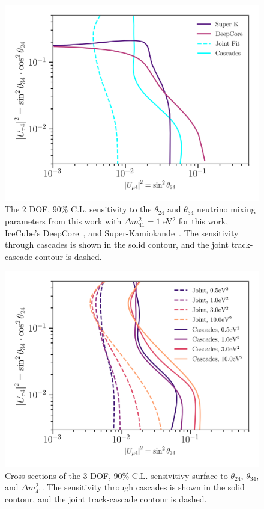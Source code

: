 \documentclass[main.tex]{subfiles}
\begin{document}
\begin{figure}
    \centering
    \includegraphics[width=0.85\linewidth]{figures/superPlot_1.00.png}
    \caption{The 2 DOF, 90\% C.L. sensitivity to the $\theta_{24}$ and $\theta_{34}$ neutrino mixing parameters from this work with $\Delta m_{41}^{2}=1$ eV$^{2}$ for this work, IceCube's DeepCore~\cite{Aartsen_2017_dc}, and Super-Kamiokande~\cite{PhysRevD.91.052019}. The sensitivity through cascades is shown in the solid contour, and the joint track-cascade contour is dashed.}\label{fig:jointplot}
\end{figure}


\begin{figure}
    \centering
    \includegraphics[width=0.85\linewidth]{figures/manyPlot.png}
    \caption{Cross-sections of the 3 DOF, 90\% C.L. sensivitivy surface to $\theta_{24}$,  $\theta_{34}$, and $\Delta m_{41}^{2}$. The sensitivity through cascades is shown in the solid contour, and the joint track-cascade contour is dashed.}\label{fig:manyplot}
\end{figure}
\end{document}
